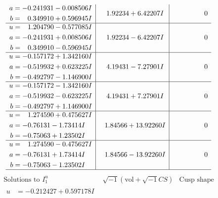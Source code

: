\documentclass[1p]{elsarticle_modified}
\theoremstyle{definition}
\newcommand{\I}{\sqrt{-1}}
\begin{document}
$$\begin{array}{c|c|c}
\begin{aligned}
a &= -0.241931 - 0.008506 I \\
b &= \phantom{-}0.349910 + 0.596945 I\end{aligned}
 & \phantom{-}1.92234 + 6.42207 I & \phantom{-0.000000 } 0 \\ \hline\begin{aligned}
u &= \phantom{-}1.204790 - 0.577085 I \\
a &= -0.241931 + 0.008506 I \\
b &= \phantom{-}0.349910 - 0.596945 I\end{aligned}
 & \phantom{-}1.92234 - 6.42207 I & \phantom{-0.000000 } 0 \\ \hline\begin{aligned}
u &= -0.157172 + 1.342160 I \\
a &= -0.519932 + 0.623225 I \\
b &= -0.492797 - 1.146900 I\end{aligned}
 & \phantom{-}4.19431 - 7.27901 I & \phantom{-0.000000 } 0 \\ \hline\begin{aligned}
u &= -0.157172 - 1.342160 I \\
a &= -0.519932 - 0.623225 I \\
b &= -0.492797 + 1.146900 I\end{aligned}
 & \phantom{-}4.19431 + 7.27901 I & \phantom{-0.000000 } 0 \\ \hline\begin{aligned}
u &= \phantom{-}1.274590 + 0.475627 I \\
a &= -0.76131 - 1.73414 I \\
b &= -0.75063 + 1.23502 I\end{aligned}
 & \phantom{-}1.84566 + 13.92260 I & \phantom{-0.000000 } 0 \\ \hline\begin{aligned}
u &= \phantom{-}1.274590 - 0.475627 I \\
a &= -0.76131 + 1.73414 I \\
b &= -0.75063 - 1.23502 I\end{aligned}
 & \phantom{-}1.84566 - 13.92260 I & \phantom{-0.000000 } 0\\
 \hline 
 \end{array}$$\newpage$$\begin{array}{c|c|c}  
\text{Solutions to }I^u_{1}& \I (\text{vol} + \sqrt{-1}CS) & \text{Cusp shape}\\
 \hline 
\begin{aligned}
u &= -0.212427 + 0.597178 I \\

\end{aligned}
\end{array}$$
\end{document}

